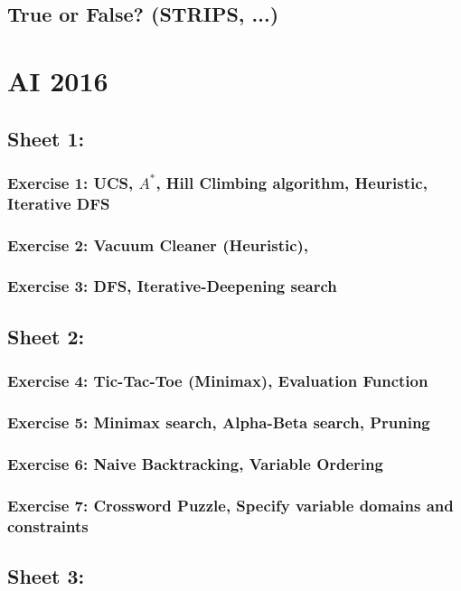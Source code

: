 \documentclass{article}
\begin{document}
    \subsection{True or False? (STRIPS, ...)}
    



\section{AI 2016}
    \subsection{Sheet 1:}
        \subsubsection{Exercise 1: UCS, $A^*$, Hill Climbing algorithm, Heuristic, Iterative DFS}
        \subsubsection{Exercise 2: Vacuum Cleaner (Heuristic), }
        \subsubsection{Exercise 3: DFS, Iterative-Deepening search}
    \subsection{Sheet 2:}
        \subsubsection{Exercise 4: Tic-Tac-Toe (Minimax), Evaluation Function}
        \subsubsection{Exercise 5: Minimax search, Alpha-Beta search, Pruning}
        \subsubsection{Exercise 6: Naive Backtracking, Variable Ordering}
        \subsubsection{Exercise 7: Crossword Puzzle, Specify variable domains and constraints}
    \subsection{Sheet 3:}
\end{document}
